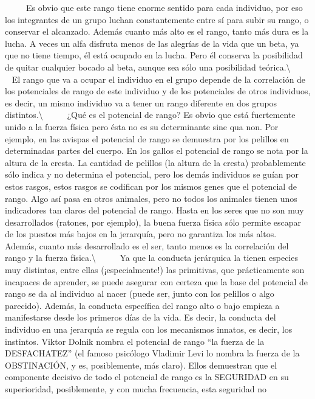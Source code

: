 ~ ~ ~ Es obvio que este rango tiene enorme sentido para cada individuo,
por eso los integrantes de un grupo luchan constantemente entre sí para
subir su rango, o conservar el alcanzado. Además cuanto más alto es el
rango, tanto más dura es la lucha. A veces un alfa disfruta menos de las
alegrías de la vida que un beta, ya que no tiene tiempo, él está ocupado
en la lucha. Pero él conserva la posibilidad de quitar cualquier bocado
al beta, aunque sea sólo una posibilidad teórica.\textbackslash{} ~ ~ ~
El rango que va a ocupar el individuo en el grupo depende de la
correlación de los potenciales de rango de este individuo y de los
potenciales de otros individuos, es decir, un mismo individuo va a tener
un rango diferente en dos grupos distintos.\textbackslash{} ~ ~ ~ ¿Qué
es el potencial de rango? Es obvio que está fuertemente unido a la
fuerza física pero ésta no es su determinante sine qua non. Por ejemplo,
en las avispas el potencial de rango se demuestra por los pelillos en
determinadas partes del cuerpo. En los gallos el potencial de rango se
nota por la altura de la cresta. La cantidad de pelillos (la altura de
la cresta) probablemente sólo indica y no determina el potencial, pero
los demás individuos se guían por estos rasgos, estos rasgos se
codifican por los mismos genes que el potencial de rango. Algo así pasa
en otros animales, pero no todos los animales tienen unos indicadores
tan claros del potencial de rango. Hasta en los seres que no son muy
desarrollados (ratones, por ejemplo), la buena fuerza física sólo
permite escapar de los puestos más bajos en la jerarquía, pero no
garantiza los más altos. Además, cuanto más desarrollado es el ser,
tanto menos es la correlación del rango y la fuerza
física.\textbackslash{} ~ ~ ~ Ya que la conducta jerárquica la tienen
especies muy distintas, entre ellas (¡especialmente!) las primitivas,
que prácticamente son incapaces de aprender, se puede asegurar con
certeza que la base del potencial de rango se da al individuo al nacer
(puede ser, junto con los pelillos o algo parecido). Además, la conducta
específica del rango alto o bajo empieza a manifestarse desde los
primeros días de la vida. Es decir, la conducta del individuo en una
jerarquía se regula con los mecanismos innatos, es decir, los instintos.
Viktor Dolnik nombra el potencial de rango ``la fuerza de la
DESFACHATEZ'' (el famoso psicólogo Vladimir Levi lo nombra la fuerza de
la OBSTINACIÓN, y es, posiblemente, más claro). Ellos demuestran que el
componente decisivo de todo el potencial de rango es la SEGURIDAD en su
superioridad, posiblemente, y con mucha frecuencia, esta seguridad no

